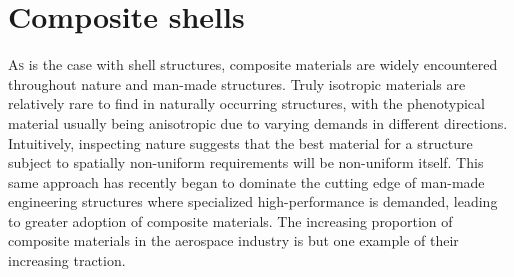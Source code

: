 



\chapter{Composite shells}
\label{chap:chapter_2_1}

\renewcommand{\Thema}{Composite shells}

\lettrine[lines=2]{A}{s} is the case with shell structures, composite materials are widely encountered throughout nature and man-made structures. Truly isotropic materials are relatively rare to find in naturally occurring structures, with the phenotypical material usually being anisotropic due to varying demands in different directions. Intuitively, inspecting nature suggests that the best material for a structure subject to spatially non-uniform requirements will be non-uniform itself. This same approach has recently began to dominate the cutting edge of man-made engineering structures where specialized high-performance is demanded, leading to greater adoption of composite materials. The increasing proportion of composite materials in the aerospace industry is but one example of their increasing traction.

